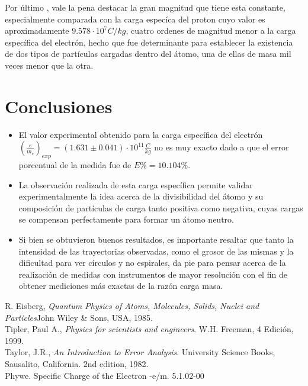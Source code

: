 \documentclass[prb,aps,twocolumn,preprintnumbers,amsmath,amssymb]{revtex4}
\begin{document}
Por último , vale la pena destacar la gran magnitud que tiene esta constante, especialmente comparada con la carga especíca del proton cuyo valor es aproximadamente $9.578 \cdot 10^7 C/kg$, cuatro ordenes de magnitud menor a la carga específica del electrón, hecho que fue determinante para establecer la existencia de dos tipos de partículas cargadas dentro del átomo, una de ellas de masa mil veces menor que la otra.\\


\section{Conclusiones}

\begin{itemize}
	
	\item El valor experimental obtenido para la carga específica del electrón $\left( \frac{e}{m_{e}} \right)_{exp} = (1.631 \pm 0.041) \cdot 10^{11} \frac{C}{kg}$ no es muy exacto dado a que el error porcentual de la medida fue de $E\% = 10.104\%$.
		
	\item La observación realizada de esta carga específica permite validar experimentalmente la idea acerca de la divisibilidad del átomo y su composición de partículas de carga tanto positiva como negativa, cuyas cargas se compensan perfectamente para formar un átomo neutro.
	
	\item Si bien se obtuvieron buenos resultados, es importante resaltar que tanto la intensidad de las trayectorias observadas, como el grosor de las mismas y la dificultad para ver círculos y no espirales, da pie para pensar acerca de la realización de medidas con instrumentos de mayor resolución con el fin de obtener mediciones más exactas de la razón carga masa.
	
\end{itemize}

\begin{thebibliography}{99}
 R. Eisberg, {\it Quantum Physics of Atoms, Molecules, Solids, Nuclei and Particles}{John Wiley \& Sons, USA, 1985}.\\

 Tipler, Paul A., \textit{Physics for scientists and engineers}. W.H. Freeman, 4 Edici\' on, 1999.\\
 Taylor, J.R., \textit{An Introduction to Error Analysis}. University Science Books, Sausalito, California. 2nd edition, 1982.\\
 Phywe. Specific Charge of the Electron -e/m. 5.1.02-00\\
\end{thebibliography}
\end{document}
